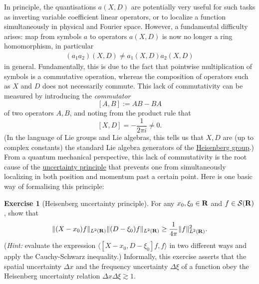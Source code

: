 \documentclass[11pt]{article}
\theoremstyle{definition}
\newtheorem{exercise}[theorem]{Exercise}
\begin{document}
In principle, the quantisations \({a(X,D)}\) are potentially very useful for such tasks as inverting variable coefficient linear operators, or to localize a function simultaneously in physical and Fourier space. However, a fundamental difficulty arises: map from symbols \({a}\) to operators \({a(X,D)}\) is now no longer a ring homomorphism, in particular 
\begin{align}\label{ringho}
  (a_1 a_2)(X,D) \neq a_1(X,D) a_2(X,D) 
\end{align}
 in general. Fundamentally, this is due to the fact that pointwise multiplication of symbols is a commutative operation, whereas the composition of operators such as \({X}\) and \({D}\) does not necessarily commute. This lack of commutativity can be measured by introducing the \emph{commutator} 
\[\displaystyle  [A,B] := AB - BA\]
 of two operators \({A,B}\), and noting from the product rule that 
\[\displaystyle  [X,D] = -\frac{1}{2\pi i} \neq 0.\]
 (In the language of Lie groups and Lie algebras, this tells us that \({X,D}\) are (up to complex constants) the standard Lie algebra generators of the \href{https://en.wikipedia.org/wiki/Heisenberg_group}{Heisenberg group}.) From a quantum mechanical perspective, this lack of commutativity is the root cause of the \href{https://en.wikipedia.org/wiki/Uncertainty_principle}{uncertainty principle} that prevents one from simultaneously localizing in both position and momentum past a certain point. Here is one basic way of formalising this principle:
\begin{exercise}[Heisenberg uncertainty principle]
 \label{hup} For any \({x_0, \xi_0 \in {\bf R}}\) and \({f \in \mathcal{S}({\bf R})}\), show that 
\[\displaystyle  \| (X-x_0) f \|_{L^2({\bf R})} \| (D-\xi_0) f\|_{L^2({\bf R})} \geq \frac{1}{4\pi} \|f\|_{L^2({\bf R})}^2.\]
 (\emph{Hint:} evaluate the expression \({\langle [X-x_0, D - \xi_0] f, f \rangle}\) in two different ways and apply the Cauchy-Schwarz inequality.) Informally, this exercise asserts that the spatial uncertainty \({\Delta x}\) and the frequency uncertainty \({\Delta \xi}\) of a function obey the Heisenberg uncertainty relation \({\Delta x \Delta \xi \gtrsim 1}\). 
\end{exercise}
\end{document}
